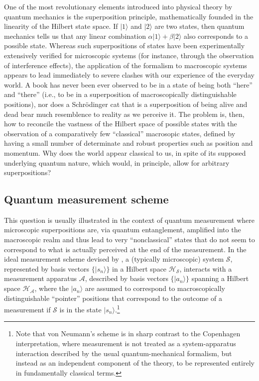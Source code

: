 \documentclass[twocolumn,rmp,aps,amsmath,amsfonts,noshowkeys,noshowpacs]{revtex4}
\newcommand{\ket}[1]{\ensuremath{|{#1\rangle}}}
\begin{document}
One of the most revolutionary elements introduced into physical theory
by quantum mechanics is the superposition principle, mathematically
founded in the linearity of the Hilbert state space. If $\ket{1}$ and
$\ket{2}$ are two states, then quantum mechanics tells us that any
linear combination $\alpha \ket{1} + \beta \ket{2}$ also corresponds
to a possible state. Whereas such superpositions of states have been
experimentally extensively verified for microscopic systems (for
instance, through the observation of interference effects), the
application of the formalism to macroscopic systems appears to lead
immediately to severe clashes with our experience of the everyday
world. A book has never been ever observed to be in a state of being
both ``here'' and ``there'' (i.e., to be in a superposition of
macroscopically distinguishable positions), nor does a Schr\"odinger
cat that is a superposition of being alive and dead bear much
resemblence to reality as we perceive it.  The problem is, then, how
to reconcile the vastness of the Hilbert space of possible states with
the observation of a comparatively few ``classical'' macrosopic
states, defined by having a small number of determinate and robust
properties such as position and momentum. Why does the world appear
classical to us, in spite of its supposed underlying quantum nature,
which would, in principle, allow for arbitrary superpositions?


\subsection{Quantum measurement scheme}

This question is usually illustrated in the context of quantum
measurement where microscopic superpositions are, via quantum
entanglement, amplified into the macroscopic realm and thus lead to
very ``nonclassical'' states that do not seem to correspond to what is
actually perceived at the end of the measurement. In the ideal
measurement scheme devised by \citet{Neumann:1932:gq}, a (typically
microscopic) system $\mathcal{S}$, represented by basis vectors $\{
\ket{s_n} \}$ in a Hilbert space $\mathcal{H}_{\mathcal{S}}$,
interacts with a measurement apparatus $\mathcal{A}$, described by
basis vectors $\{ \ket{a_n} \}$ spanning a Hilbert space
$\mathcal{H}_{\mathcal{A}}$, where the $\ket{a_n}$ are assumed to
correspond to macroscopically distinguishable ``pointer'' positions
that correspond to the outcome of a measurement if $\mathcal{S}$ is in
the state $\ket{s_n}$.\footnote{Note that von Neumann's scheme is in
  sharp contrast to the Copenhagen interpretation, where measurement
  is not treated as a system-apparatus interaction described by the
  usual quantum-mechanical formalism, but instead as an independent
  component of the theory, to be represented entirely in fundamentally
  classical terms.}
\end{document}
